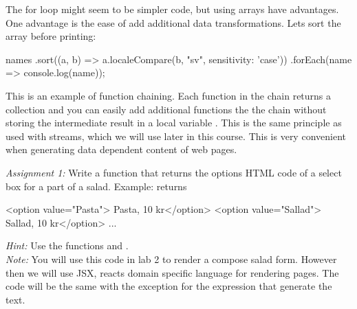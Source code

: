 \documentclass[fleqn, article, a4paper]{memoir}
\begin{document}
\begin{Assignments}
The for loop might seem to be simpler code, but using arrays have advantages. One advantage is the ease of add additional data transformations. Lets sort the array before printing:
\begin{Code}
names
.sort((a, b) => a.localeCompare(b, "sv", {sensitivity: 'case'}))
.forEach(name => console.log(name));
\end{Code}
This is an example of function chaining. Each function in the chain returns a collection and you can easily add additional functions the the chain without storing the intermediate result in a local variable . This is the same principle as used with streams, which we will use later in this course. This is very convenient when generating data dependent content of web pages.

\emph{Assignment 1:} Write a function that returns the options HTML code of a select box for a part of a salad. Example:
 returns 
\begin{Code}
<option value="Pasta"> Pasta, 10 kr</option>
<option value="Sallad"> Sallad, 10 kr</option> ...
\end{Code}
\emph{Hint:} Use the functions  and .
\\ \emph{Note:} You will use this code in lab 2 to render a compose salad form. However then we will use JSX, reacts domain specific language for rendering pages. The code will be the same with the exception for the expression that generate the text.


\end{Assignments}
\end{document}
